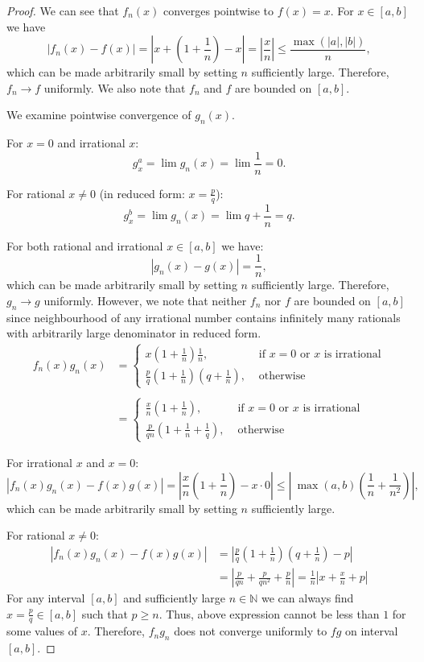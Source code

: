\documentclass{article}
\begin{document}
\begin{proof}

We can see that $f_n(x)$ converges pointwise to $f(x) = x$. For $x \in [a,b]$ we have
\[ | f_n(x) - f(x) | = \left| x + \left( 1+\frac{1}{n} \right) - x \right| = \left| \frac{x}{n} \right| \leq \frac{\max(|a|,|b|)}{n}, \]
which can be made arbitrarily small by setting $n$ sufficiently large. 
Therefore, $f_n \to f$ uniformly. We also note that $f_n$ and $f$ are bounded on $[a,b]$.

We examine pointwise convergence of $g_n(x)$.

For $x=0$ and irrational $x$:
\[ g^a_x = \lim g_n(x) = \lim \frac{1}{n} = 0. \]

For rational $x \neq 0$ (in reduced form: $x = \frac{p}{q}$):
\[ g^b_x = \lim g_n(x) = \lim q+\frac{1}{n} = q. \]

For both rational and irrational $x \in [a,b]$ we have:
\[ |g_n(x) - g(x)| = \frac{1}{n}, \]
which can be made arbitrarily small by setting $n$ sufficiently large. 
Therefore, $g_n \to g$ uniformly. However, we note that neither $f_n$ nor $f$ are bounded on $[a,b]$ since neighbourhood of any irrational number contains infinitely many rationals with arbitrarily large denominator in reduced form.
\[
\begin{aligned}
    f_n(x) g_n(x) 
    & =
    \begin{cases}
        x \left( 1+\frac{1}{n} \right) \frac{1}{n}, & \text{ if $x=0$ or $x$ is irrational} \\
        \frac{p}{q} \left( 1+\frac{1}{n} \right) (q+\frac{1}{n}), & \text{ otherwise}
    \end{cases} \\\\
    & =
    \begin{cases}
        \frac{x}{n} \left( 1+\frac{1}{n} \right), & \text{ if $x=0$ or $x$ is irrational} \\
        \frac{p}{qn} \left( 1+\frac{1}{n}+\frac{1}{q} \right), & \text{ otherwise}
    \end{cases}
\end{aligned}
\]

For irrational $x$ and $x=0$:
\[ |f_n(x) g_n(x) - f(x) g(x) | = \left| \frac{x}{n} \left( 1+\frac{1}{n} \right) - x \cdot 0 \right| \leq \left| \> \max(a,b) \left( \frac{1}{n}+\frac{1}{n^2} \right) \right|, \]
which can be made arbitrarily small by setting $n$ sufficiently large.

For rational $x \neq 0$:
\begin{align*}
    |f_n(x) g_n(x) - f(x) g(x) | & = \left| \frac{p}{q} \left( 1+\frac{1}{n} \right) \left( q+\frac{1}{n} \right) - p \right| \\
    & = \left| \frac{p}{qn} + \frac{p}{qn^2} + \frac{p}{n} \right| = \frac{1}{n} \left| x + \frac{x}{n} + p \right|
\end{align*}
For any interval $[a,b]$ and sufficiently large $n\in\mathbb{N}$ we can always find $x=\frac{p}{q} \in [a,b]$ such that $p \geq n$.
Thus, above expression cannot be less than $1$ for some values of $x$. 
Therefore, $f_n g_n$ does not converge uniformly to $f g$ on interval $[a,b]$.

\end{proof}
\end{document}
